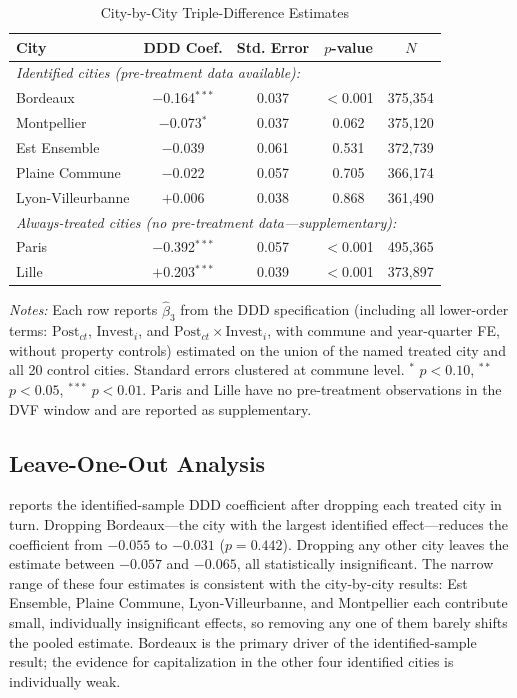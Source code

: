 \documentclass[12pt]{article}
\begin{document}
\begin{table}[H]
\centering
\caption{City-by-City Triple-Difference Estimates}
\label{tab:city}
\begin{threeparttable}
\begin{tabular}{lcccc}
\toprule
City & DDD Coef. & Std. Error & $p$-value & $N$ \\
\midrule
\multicolumn{5}{l}{\emph{Identified cities (pre-treatment data available):}} \\
Bordeaux & $-$0.164$^{***}$ & 0.037 & $<$0.001 & 375,354 \\
Montpellier & $-$0.073$^{*}$ & 0.037 & 0.062 & 375,120 \\
Est Ensemble & $-$0.039 & 0.061 & 0.531 & 372,739 \\
Plaine Commune & $-$0.022 & 0.057 & 0.705 & 366,174 \\
Lyon-Villeurbanne & $+$0.006 & 0.038 & 0.868 & 361,490 \\
\midrule
\multicolumn{5}{l}{\emph{Always-treated cities (no pre-treatment data---supplementary):}} \\
Paris & $-$0.392$^{***}$ & 0.057 & $<$0.001 & 495,365 \\
Lille & $+$0.203$^{***}$ & 0.039 & $<$0.001 & 373,897 \\
\bottomrule
\end{tabular}
\begin{tablenotes}[flushleft]
\small
\item \emph{Notes:} Each row reports $\hat{\beta}_3$ from the DDD specification (including all lower-order terms: $\text{Post}_{ct}$, $\text{Invest}_i$, and $\text{Post}_{ct} \times \text{Invest}_i$, with commune and year-quarter FE, without property controls) estimated on the union of the named treated city and all 20 control cities. Standard errors clustered at commune level. $^{*}$ $p<0.10$, $^{**}$ $p<0.05$, $^{***}$ $p<0.01$. Paris and Lille have no pre-treatment observations in the DVF window and are reported as supplementary.
\end{tablenotes}
\end{threeparttable}
\end{table}

\subsection{Leave-One-Out Analysis}

 reports the identified-sample DDD coefficient after dropping each treated city in turn. Dropping Bordeaux---the city with the largest identified effect---reduces the coefficient from $-0.055$ to $-0.031$ ($p = 0.442$). Dropping any other city leaves the estimate between $-0.057$ and $-0.065$, all statistically insignificant. The narrow range of these four estimates is consistent with the city-by-city results: Est Ensemble, Plaine Commune, Lyon-Villeurbanne, and Montpellier each contribute small, individually insignificant effects, so removing any one of them barely shifts the pooled estimate. Bordeaux is the primary driver of the identified-sample result; the evidence for capitalization in the other four identified cities is individually weak.
\end{document}
